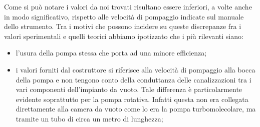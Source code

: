 Come si può notare i valori da noi trovati risultano essere inferiori, a volte anche in modo significativo, rispetto alle velocità di pompaggio indicate sul manuale dello strumento.
Tra i motivi che possono incidere su queste discrepanze fra i valori sperimentali e quelli teorici abbiamo ipotizzato che i più rilevanti siano:

\begin{itemize}
	\item{l'usura della pompa stessa che porta ad una minore efficienza;}
	\item{i valori forniti dal costruttore si riferisce alla velocità di pompaggio alla bocca della pompa e non tengono conto della conduttanza delle canalizzazioni tra i vari componenti dell'impianto da vuoto. Tale differenza è particolarmente evidente soprattutto per la pompa rotativa. Infatti questa non era collegata direttamente alla camera da vuoto come lo era la pompa turbomolecolare, ma tramite un tubo di circa un metro di lunghezza;}%
\end{itemize}


